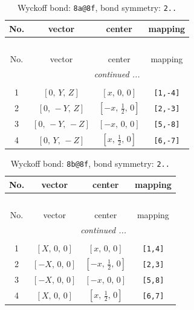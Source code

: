 \documentclass[fleqn,8pt]{jsarticle}
\begin{document}
\begin{longtable}{cccc}
\caption{Wyckoff bond: {\tt 8a@8f}, bond symmetry: {\tt 2..}}
 \\
 \hline \hline
No. & vector & center & mapping \\ \hline \endfirsthead

\multicolumn{3}{l}{\tablename\ \thetable{}} \\
 \hline \hline
No. & vector & center & mapping \\ \hline \endhead

 \hline \hline
\multicolumn{3}{r}{\footnotesize\it continued ...} \\ \endfoot

 \hline \hline
\multicolumn{3}{r}{} \\ \endlastfoot

1 & $\left[ 0,\, Y,\, Z \right]$ & $\left[ x,\, 0,\, 0 \right]$ & {\tt [1,-4]} \\ \hline
2 & $\left[ 0,\, - Y,\, Z \right]$ & $\left[ - x,\, \frac{1}{2},\, 0 \right]$ & {\tt [2,-3]} \\ \hline
3 & $\left[ 0,\, - Y,\, - Z \right]$ & $\left[ - x,\, 0,\, 0 \right]$ & {\tt [5,-8]} \\ \hline
4 & $\left[ 0,\, Y,\, - Z \right]$ & $\left[ x,\, \frac{1}{2},\, 0 \right]$ & {\tt [6,-7]} \\
\end{longtable}
\renewcommand{\arraystretch}{1.2}
\begin{longtable}{cccc}
\caption{Wyckoff bond: {\tt 8b@8f}, bond symmetry: {\tt 2..}}
 \\
 \hline \hline
No. & vector & center & mapping \\ \hline \endfirsthead

\multicolumn{3}{l}{\tablename\ \thetable{}} \\
 \hline \hline
No. & vector & center & mapping \\ \hline \endhead

 \hline \hline
\multicolumn{3}{r}{\footnotesize\it continued ...} \\ \endfoot

 \hline \hline
\multicolumn{3}{r}{} \\ \endlastfoot

1 & $\left[ X,\, 0,\, 0 \right]$ & $\left[ x,\, 0,\, 0 \right]$ & {\tt [1,4]} \\ \hline
2 & $\left[ - X,\, 0,\, 0 \right]$ & $\left[ - x,\, \frac{1}{2},\, 0 \right]$ & {\tt [2,3]} \\ \hline
3 & $\left[ - X,\, 0,\, 0 \right]$ & $\left[ - x,\, 0,\, 0 \right]$ & {\tt [5,8]} \\ \hline
4 & $\left[ X,\, 0,\, 0 \right]$ & $\left[ x,\, \frac{1}{2},\, 0 \right]$ & {\tt [6,7]} \\
\end{longtable}
\end{document}
